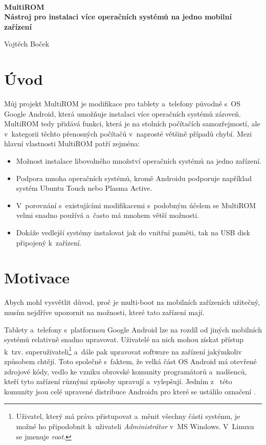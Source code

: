 \documentclass[12pt, a4paper, oneside]{article}
\newcommand{\B}{\textbf} %
\newcommand{\It}{\textit}  %
\begin{document}
~
\vspace{-20mm}
\begin{center}

\Large
\B{MultiROM \\ Nástroj pro instalaci více operačních systémů na jedno mobilní zařízení}
\large

Vojtěch Boček

\end{center}
\section*{Úvod}
\label{uvod}
Můj projekt MultiROM je modifikace pro tablety a~telefony původně s~OS Google Android, která umožňuje instalaci více operačních systémů zároveň. MultiROM tedy přidává funkci, která je na stolních počítačích samozřejmostí, ale v~kategorii těchto přenosných počítačů v~naprosté většině případů chybí. Mezi hlavní vlastnosti MultiROM patří zejména:

\begin{itemize}
    \item Možnost instalace libovolného množství operačních systémů na jedno zařízení.
    \item Podpora mnoha operačních systémů, kromě Androidu podporuje například systém Ubuntu Touch nebo Plasma Active.
    \item V~porovnání s~existujícími modifikacemi s~podobným účelem se MultiROM velmi snadno používá a~často má mnohem větší možnosti.
    \item Dokáže vedlejší systémy instalovat jak do vnitřní paměti, tak na USB disk připojený k~zařízení.
\end{itemize}

\section{Motivace}
Abych mohl vysvětlit důvod, proč je multi-boot na mobilních zařízeních užitečný, musím nejdříve upozornit na možnosti, které tato zařízení mají.

Tablety a~telefony s~platformou Google Android lze na rozdíl od jiných mobilních systémů relativně snadno upravovat. Uživatelé na nich mohou získat přístup k~tzv. superuživateli\footnote{Uživatel, který má práva přistupovat a~měnit všechny části systému, je možné ho připodobnit k~uživateli \It{Administrátor} v~MS Windows. V~Linuxu se jmenuje \It{root}.} a~dále pak upravovat software na zařízení jakýmkoliv způsobem chtějí. Toto společně s~faktem, že velká část OS Android má otevřené zdrojové kódy, vedlo ke vzniku obrovské komunity programátorů a~nadšenců, kteří tyto zařízení různými způsoby upravují a~vylepšují. Jedním z~ této komunity jsou celé upravené distribuce Androidu pro které se ustálilo označení .
\end{document}
